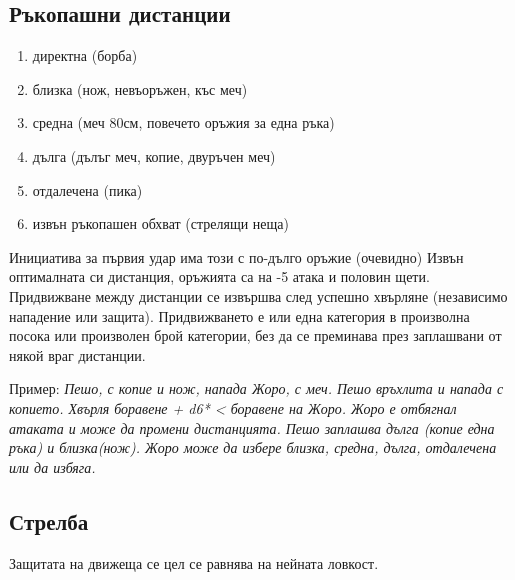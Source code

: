 \subsection{Ръкопашни дистанции}
\begin{enumerate}
\item{директна (борба)}
\item{близка (нож, невъоръжен, къс меч)}
\item{средна (меч 80см, повечето оръжия за една ръка)}
\item{дълга (дълъг меч, копие, двуръчен меч)}
\item{отдалечена (пика)}
\item{извън ръкопашен обхват (стрелящи неща)}
\end{enumerate}
Инициатива за първия удар има този с по-дълго оръжие (очевидно)
Извън оптималната си дистанция, оръжията са на -5 атака и половин щети.
Придвижване между дистанции се извършва след успешно хвърляне (независимо нападение или защита). Придвижването е или една категория в произволна посока или произволен брой категории, без да се преминава през заплашвани от някой враг дистанции. 

Пример:
\emph{Пешо, с копие и нож, напада Жоро, с меч.
Пешо връхлита и напада с копието. Хвърля боравене + d6* < боравене на Жоро. Жоро е отбягнал атаката и може да промени дистанцията. Пешо заплашва дълга (копие една ръка) и близка(нож). Жоро може да избере близка, средна, дълга, отдалечена или да избяга.
}

\subsection{Стрелба}
Защитата на движеща се цел се равнява на нейната ловкост.

